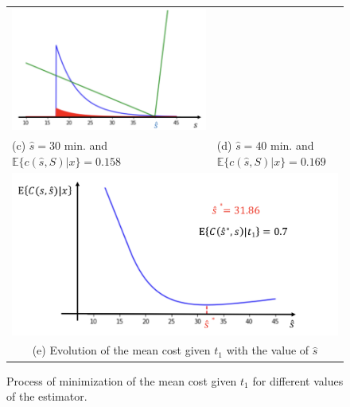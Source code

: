 \begin{solution}
\begin{itemize}
\begin{figure}[!t]
\begin{tabular}{m{}m{}}
\includegraphics[scale=.3]{Figures/Fig_MC1_16.png}\\
(c) $\hat{s} = 30$ min. and  $\mathbb{E}\{c(\hat{s},S)|x\}= 0.158$ &
(d) $\hat{s} = 40$ min. and  $\mathbb{E}\{c(\hat{s},S)|x\}=0.169$ \\
\multicolumn{2}{c}{\includegraphics[scale=.25]{Figures/Fig_MC1_17.png}}\\
\multicolumn{2}{c}{(e) Evolution of the mean cost given  $t_1$ with the value of $\hat{s}$}
\end{tabular}
\caption{Process of minimization of the mean cost given $t_1$ for different values of the estimator.}
\label{Fig_MC1_13_17}
\end{figure}


\end{itemize}
\end{solution}
